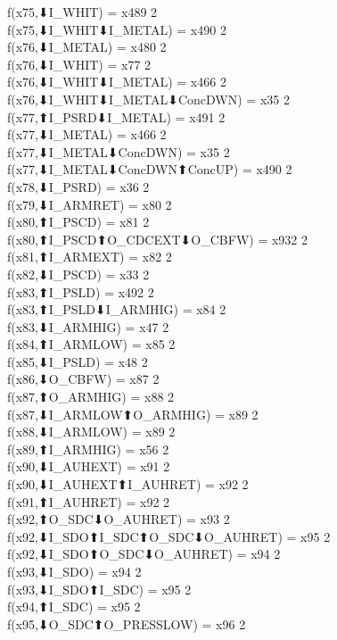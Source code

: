 f(x75,⬇I_WHIT) = x489 {2} \\
f(x75,⬇I_WHIT⬇I_METAL) = x490 {2} \\
f(x76,⬇I_METAL) = x480 {2} \\
f(x76,⬇I_WHIT) = x77 {2} \\
f(x76,⬇I_WHIT⬇I_METAL) = x466 {2} \\
f(x76,⬇I_WHIT⬇I_METAL⬇ConcDWN) = x35 {2} \\
f(x77,⬆I_PSRD⬇I_METAL) = x491 {2} \\
f(x77,⬇I_METAL) = x466 {2} \\
f(x77,⬇I_METAL⬇ConcDWN) = x35 {2} \\
f(x77,⬇I_METAL⬇ConcDWN⬆ConcUP) = x490 {2} \\
f(x78,⬇I_PSRD) = x36 {2} \\
f(x79,⬇I_ARMRET) = x80 {2} \\
f(x80,⬆I_PSCD) = x81 {2} \\
f(x80,⬆I_PSCD⬆O_CDCEXT⬇O_CBFW) = x932 {2} \\
f(x81,⬆I_ARMEXT) = x82 {2} \\
f(x82,⬇I_PSCD) = x33 {2} \\
f(x83,⬆I_PSLD) = x492 {2} \\
f(x83,⬆I_PSLD⬇I_ARMHIG) = x84 {2} \\
f(x83,⬇I_ARMHIG) = x47 {2} \\
f(x84,⬆I_ARMLOW) = x85 {2} \\
f(x85,⬇I_PSLD) = x48 {2} \\
f(x86,⬇O_CBFW) = x87 {2} \\
f(x87,⬆O_ARMHIG) = x88 {2} \\
f(x87,⬇I_ARMLOW⬆O_ARMHIG) = x89 {2} \\
f(x88,⬇I_ARMLOW) = x89 {2} \\
f(x89,⬆I_ARMHIG) = x56 {2} \\
f(x90,⬇I_AUHEXT) = x91 {2} \\
f(x90,⬇I_AUHEXT⬆I_AUHRET) = x92 {2} \\
f(x91,⬆I_AUHRET) = x92 {2} \\
f(x92,⬆O_SDC⬇O_AUHRET) = x93 {2} \\
f(x92,⬇I_SDO⬆I_SDC⬆O_SDC⬇O_AUHRET) = x95 {2} \\
f(x92,⬇I_SDO⬆O_SDC⬇O_AUHRET) = x94 {2} \\
f(x93,⬇I_SDO) = x94 {2} \\
f(x93,⬇I_SDO⬆I_SDC) = x95 {2} \\
f(x94,⬆I_SDC) = x95 {2} \\
f(x95,⬇O_SDC⬆O_PRESSLOW) = x96 {2} \\
